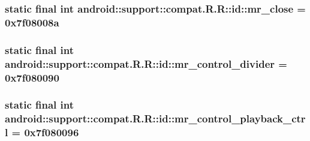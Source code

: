 \hypertarget{classandroid_1_1support_1_1compat_1_1_r_1_1id_484909aed489fe7d71031d21ba2e2b93}{
\subsubsection[{mr\_\-close}]{\setlength{\rightskip}{0pt plus 5cm}static final int android::support::compat.R.R::id::mr\_\-close = 0x7f08008a}}
\label{classandroid_1_1support_1_1compat_1_1_r_1_1id_484909aed489fe7d71031d21ba2e2b93}


\hypertarget{classandroid_1_1support_1_1compat_1_1_r_1_1id_8ed7aed65cb96af51a68c887dafec752}{
\subsubsection[{mr\_\-control\_\-divider}]{\setlength{\rightskip}{0pt plus 5cm}static final int android::support::compat.R.R::id::mr\_\-control\_\-divider = 0x7f080090}}
\label{classandroid_1_1support_1_1compat_1_1_r_1_1id_8ed7aed65cb96af51a68c887dafec752}


\hypertarget{classandroid_1_1support_1_1compat_1_1_r_1_1id_f2b350b736e437323c404d69395b97b3}{
\subsubsection[{mr\_\-control\_\-playback\_\-ctrl}]{\setlength{\rightskip}{0pt plus 5cm}static final int android::support::compat.R.R::id::mr\_\-control\_\-playback\_\-ctrl = 0x7f080096}}
\label{classandroid_1_1support_1_1compat_1_1_r_1_1id_f2b350b736e437323c404d69395b97b3}


